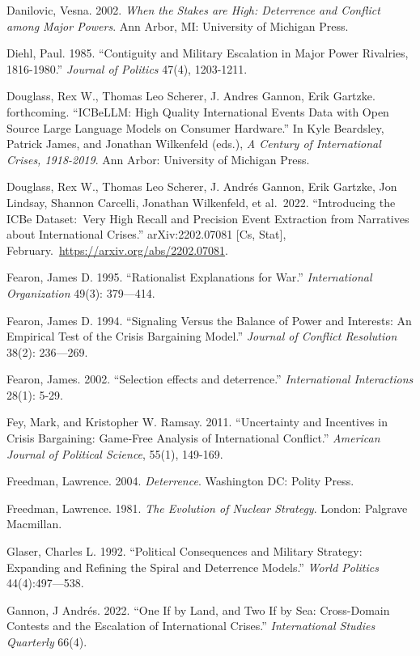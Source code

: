 \documentclass[
]{article}
\begin{document}
Danilovic, Vesna. 2002. \emph{When the Stakes are High: Deterrence and
Conflict among Major Powers}. Ann Arbor, MI: University of Michigan
Press.

Diehl, Paul. 1985. ``Contiguity and Military Escalation in Major Power
Rivalries, 1816-1980.'' \emph{Journal of Politics} 47(4), 1203-1211.

Douglass, Rex W., Thomas Leo Scherer, J. Andres Gannon, Erik Gartzke.
forthcoming. ``ICBeLLM: High Quality International Events Data with Open
Source Large Language Models on Consumer Hardware.'' In Kyle Beardsley,
Patrick James, and Jonathan Wilkenfeld (eds.), \emph{A Century of
International Crises, 1918-2019}. Ann Arbor: University of Michigan
Press.

Douglass, Rex W., Thomas Leo Scherer, J. Andrés Gannon, Erik Gartzke,
Jon Lindsay, Shannon Carcelli, Jonathan Wilkenfeld, et al.~2022.
``Introducing the ICBe Dataset:~Very High Recall and Precision Event
Extraction from Narratives about International Crises.''
arXiv:2202.07081 {[}Cs, Stat{]},
February.~\href{https://urldefense.com/v3/__https:/arxiv.org/abs/2202.07081__;!!Mih3wA!CLsJAkIaG18LhmH8jhnNw4GVB0of31s_n91IbLKW_lSvbtP4jy3sO8Kgd4zgE_R38RC2ALcN0AsDgo9rF1LIew$}{https://arxiv.org/abs/2202.07081}.

Fearon, James D. 1995. ``Rationalist Explanations for War.''
\emph{International Organization} 49(3): 379---414.

Fearon, James D. 1994. ``Signaling Versus the Balance of Power and
Interests: An Empirical Test of the Crisis Bargaining Model.''
\emph{Journal of Conflict Resolution} 38(2): 236---269.

Fearon, James. 2002. ``Selection effects and deterrence.''
\emph{International Interactions} 28(1): 5-29.

Fey, Mark, and Kristopher W. Ramsay. 2011. ``Uncertainty and Incentives
in Crisis Bargaining: Game‐Free Analysis of International Conflict.''
\emph{American Journal of Political Science}, 55(1), 149-169.

Freedman, Lawrence. 2004. \emph{Deterrence}. Washington DC: Polity
Press.

Freedman, Lawrence. 1981. \emph{The Evolution of Nuclear Strategy}.
London: Palgrave Macmillan.~~

Glaser, Charles L. 1992. ``Political Consequences and Military Strategy:
Expanding and Refining the Spiral and Deterrence Models.'' \emph{World
Politics} 44(4):497---538.

Gannon, J Andrés. 2022. ``One If by Land, and Two If by Sea:
Cross-Domain Contests and the Escalation of International Crises.''
\emph{International Studies Quarterly} 66(4).
\end{document}
